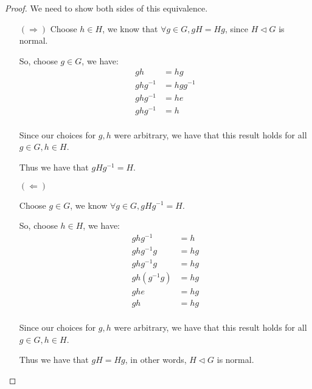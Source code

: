 \documentclass[12pt,letterpaper]{article}
\newcommand{\ghg}[1]{g#1g^{-1}}
\begin{document}
\begin{enumerate}
\begin{enumerate}
\begin{proof}
            We need to show both sides of this equivalence.

            \begin{itemize}
              \item[$(\Rightarrow)$]
                Choose $h \in H$, we know that $\forall g \in G, gH = Hg$,
                since $H \triangleleft G$ is normal.

                So, choose $g \in G$, we have:
                \begin{align*}
                  gh &= hg \\
                  ghg^{-1} &= hgg^{-1} \\
                  ghg^{-1} &= he \\
                  ghg^{-1} &= h \\
                \end{align*}

                Since our choices for $g, h$ were arbitrary,
                we have that this result holds for all $g \in G, h \in H$.

                Thus we have that $\ghg{H} = H$.

              \item[$(\Leftarrow)$]

                Choose $g \in G$, we know $\forall g \in G, \ghg{H} = H$.

                So, choose $h \in H$, we have:
                \begin{align*}
                  \ghg{h} &= h \\
                  \ghg{h}g &= hg \\
                  \ghg{h}g &= hg \\
                  gh(g^{-1}g) &= hg \\
                  ghe &= hg \\
                  gh &= hg \\
                \end{align*}

                Since our choices for $g, h$ were arbitrary,
                we have that this result holds for all $g \in G, h \in H$.

                Thus we have that $gH = Hg$, in other words, $H \triangleleft G$ is normal.
            \end{itemize}
          \end{proof}
      \end{enumerate}


\end{enumerate}
\end{document}
